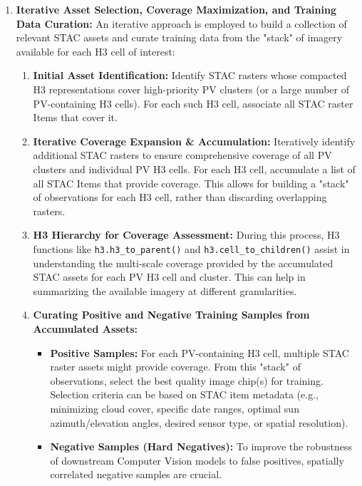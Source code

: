 \begin{enumerate}
    \item \textbf{Iterative Asset Selection, Coverage Maximization, and Training Data Curation:}
        An iterative approach is employed to build a collection of relevant STAC assets and curate training data from the "stack" of imagery available for each H3 cell of interest:
        \begin{enumerate}
            \item \textbf{Initial Asset Identification:} Identify STAC rasters whose compacted H3 representations cover high-priority PV clusters (or a large number of PV-containing H3 cells). For each such H3 cell, associate all STAC raster Items that cover it.
            \item \textbf{Iterative Coverage Expansion \& Accumulation:} Iteratively identify additional STAC rasters to ensure comprehensive coverage of all PV clusters and individual PV H3 cells. 
            For each H3 cell, accumulate a list of all STAC Items that provide coverage. This allows for building a "stack" of observations for each H3 cell, rather than discarding overlapping rasters.
            \item \textbf{H3 Hierarchy for Coverage Assessment:} During this process, H3 functions like \texttt{h3.h3\_to\_parent()} and \texttt{h3.cell\_to\_children()} assist in understanding the multi-scale coverage provided by the accumulated STAC assets for each PV H3 cell and cluster. 
            This can help in summarizing the available imagery at different granularities.
            \item \textbf{Curating Positive and Negative Training Samples from Accumulated Assets:}
            \begin{itemize}
                \item \textbf{Positive Samples:} For each PV-containing H3 cell, multiple STAC raster assets might provide coverage. 
                From this "stack" of observations, select the best quality image chip(s) for training. Selection criteria can be based on STAC item metadata (e.g., minimizing cloud cover, specific date ranges, optimal sun azimuth/elevation angles, desired sensor type, or spatial resolution). 
                \item \textbf{Negative Samples (Hard Negatives):} To improve the robustness of downstream Computer Vision models to false positives, spatially correlated negative samples are crucial\cite{kruitwagen_global_inventory_pv_units_2021, robinson_ms_planet_global_renewables_watch_2025, yang_GloSoFarID_2024}\cite{feng_10m_S2_China_2024}. 

\end{itemize}
\end{enumerate}
\end{enumerate}

